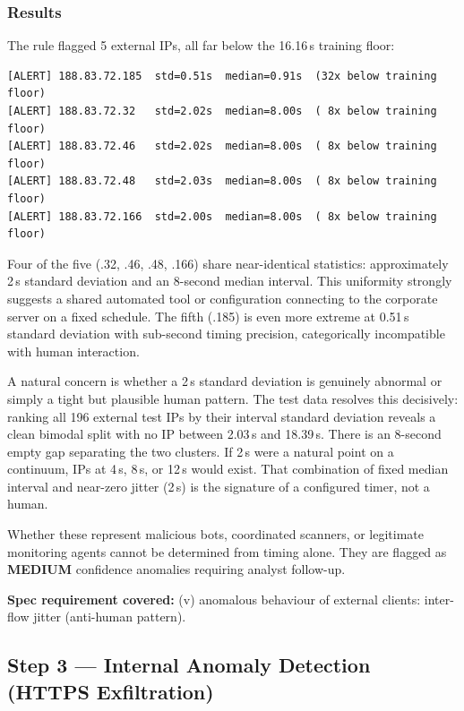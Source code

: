 \documentclass[
  11pt,
]{article}
\begin{document}
\subsubsection{Results}

The rule flagged 5 external IPs, all far below the 16.16\,s training
floor:

\begin{verbatim}
[ALERT] 188.83.72.185  std=0.51s  median=0.91s  (32x below training floor)
[ALERT] 188.83.72.32   std=2.02s  median=8.00s  ( 8x below training floor)
[ALERT] 188.83.72.46   std=2.02s  median=8.00s  ( 8x below training floor)
[ALERT] 188.83.72.48   std=2.03s  median=8.00s  ( 8x below training floor)
[ALERT] 188.83.72.166  std=2.00s  median=8.00s  ( 8x below training floor)
\end{verbatim}

Four of the five (.32, .46, .48, .166) share near-identical statistics:
approximately 2\,s standard deviation and an 8-second median interval.
This uniformity strongly suggests a shared automated tool or
configuration connecting to the corporate server on a fixed schedule.
The fifth (.185) is even more extreme at 0.51\,s standard deviation
with sub-second timing precision, categorically incompatible with human
interaction.

A natural concern is whether a 2\,s standard deviation is genuinely
abnormal or simply a tight but plausible human pattern. The test data
resolves this decisively: ranking all 196 external test IPs by their
interval standard deviation reveals a clean bimodal split with no IP
between 2.03\,s and 18.39\,s. There is an 8-second empty gap separating
the two clusters. If 2\,s were a natural point on a continuum, IPs at
4\,s, 8\,s, or 12\,s would exist.
That combination of
fixed median interval and near-zero jitter (2\,s) is the signature of
a configured timer, not a human.

Whether these represent malicious bots, coordinated scanners, or
legitimate monitoring agents cannot be determined from timing alone.
They are flagged as \textbf{MEDIUM} confidence anomalies requiring
analyst follow-up.

\medskip
\noindent\colorbox{gray!12}{\parbox{\dimexpr\linewidth-2\fboxsep\relax}{\textbf{Spec requirement covered:} (v) anomalous behaviour of external clients: inter-flow jitter (anti-human pattern).}}

\hypertarget{internal-anomaly-detection-https-exfiltration}{%
\subsection{Step 3 — Internal Anomaly Detection (HTTPS Exfiltration)}\label{internal-anomaly-detection-https-exfiltration}}
\end{document}
